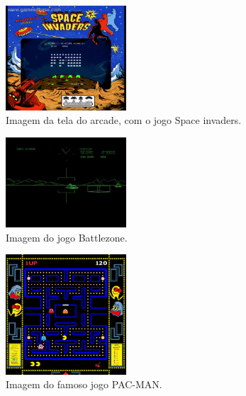 \documentclass[12pt]{article}
\begin{document}
\begin{figure}[!ht]
    \centering
    \includegraphics[width=0.4\textwidth]{spaceinvaders.jpg}
    \caption{Imagem da tela do arcade, com o jogo Space invaders.}
    \label{fig:spaceinvaders}
\end{figure}
\begin{figure}[!htb]
    \centering
    \includegraphics[width=0.4\textwidth]{battlezone.jpg}
    \caption{Imagem do jogo Battlezone.}
    \label{fig:battlezone}
\end{figure}
\begin{figure}[!ht]
    \centering
    \includegraphics[width=0.4\textwidth]{pacman.jpg}
    \caption{Imagem do famoso jogo PAC-MAN.}
    \label{fig:pacman}
\end{figure}
\newpage
\end{document}
